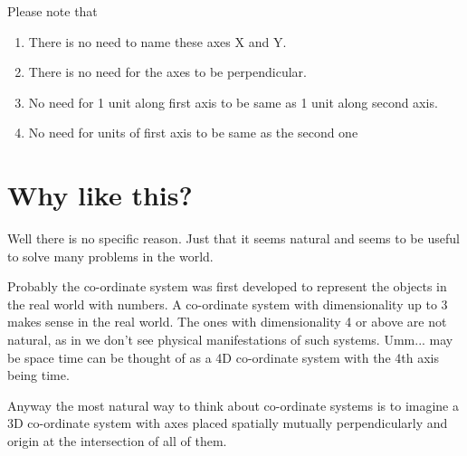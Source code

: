 \documentclass[../main.tex]{subfiles}
\begin{document}
Please note that
\begin{enumerate}
  \item There is no need to name these axes X and Y.
  \item There is no need for the axes to be perpendicular.
  \item No need for 1 unit along first axis to be same as 1 unit along second axis.
  \item No need for units of first axis to be same as the second one
\end{enumerate}

\section{Why like this?}
Well there is no specific reason. Just that it seems natural and seems to be useful to solve many problems in the world.

Probably the co-ordinate system was first developed to represent the objects in the real world with numbers. A co-ordinate system with dimensionality up to 3 makes sense in the real world. The ones with dimensionality 4 or above are not natural, as in we don't see physical manifestations of such systems. Umm... may be space time can be thought of as a 4D co-ordinate system with the 4th axis being time.

Anyway the most natural way to think about co-ordinate systems is to imagine a 3D co-ordinate system with axes placed spatially mutually perpendicularly and origin at the intersection of all of them.
\end{document}
